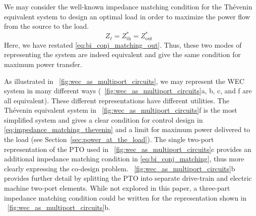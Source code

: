\documentclass[lettersize,journal]{IEEEtran}
\begin{document}
We may consider the well-known impedance matching condition for the Th\'{e}venin equivalent system to design an optimal load in order to maximize the power flow from the source to the load.
%
\begin{equation}
        Z_\ell = Z_{\textrm{th}}^* = Z_{\textrm{out}}^*
        \label{eq:impedance_matching_thevenin}
\end{equation}
%
Here, we have restated \eqref{eq:bi_conj_matching_out}.
Thus, these two modes of representing the system are indeed equivalent and give the same condition for maximum power transfer.

As illustrated in \figurename~\ref{fig:wec_as_multiport_circuits}, we may represent the WEC system in many different ways (\figurename~\ref{fig:wec_as_multiport_circuits}a, b, c, and f are all equivalent).
These different representations have different utilities.
The Th\'{e}venin equivalent system in \figurename~\ref{fig:wec_as_multiport_circuits}f is the most simplified system and gives a clear condition for control design in \eqref{eq:impedance_matching_thevenin} and a limit for maximum power delivered to the load (see Section~\ref{sec:power_at_the_load}).
The single two-port representation of the PTO used in \figurename~\ref{fig:wec_as_multiport_circuits}c provides an additional impedance matching condition in \eqref{eq:bi_conj_matching}, thus more clearly expressing the co-design problem.
\figurename~\ref{fig:wec_as_multiport_circuits}b provides further detail by splitting the PTO into separate drive-train and electric machine two-port elements.
While not explored in this paper, a three-part impedance matching condition could be written for the representation shown in \figurename~\ref{fig:wec_as_multiport_circuits}b.

\end{document}
